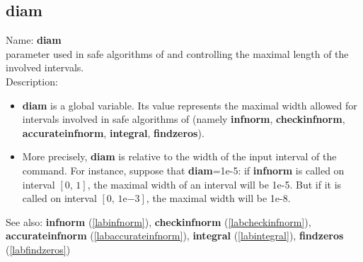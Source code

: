 \subsection{diam}
\label{labdiam}
\noindent Name: \textbf{diam}\\
parameter used in safe algorithms of \sollya and controlling the maximal length of the involved intervals.\\
\noindent Description: \begin{itemize}

\item \textbf{diam} is a global variable. Its value represents the maximal width allowed
   for intervals involved in safe algorithms of \sollya (namely \textbf{infnorm},
   \textbf{checkinfnorm}, \textbf{accurateinfnorm}, \textbf{integral}, \textbf{findzeros}).

\item More precisely, \textbf{diam} is relative to the width of the input interval of
   the command. For instance, suppose that \textbf{diam}=1e-5: if \textbf{infnorm} is called
   on interval $[0,\,1]$, the maximal width of an interval will be 1e-5. But if it
   is called on interval $[0,\,1\mathrm{e}{-3}]$, the maximal width will be 1e-8.
\end{itemize}
See also: \textbf{infnorm} (\ref{labinfnorm}), \textbf{checkinfnorm} (\ref{labcheckinfnorm}), \textbf{accurateinfnorm} (\ref{labaccurateinfnorm}), \textbf{integral} (\ref{labintegral}), \textbf{findzeros} (\ref{labfindzeros})
